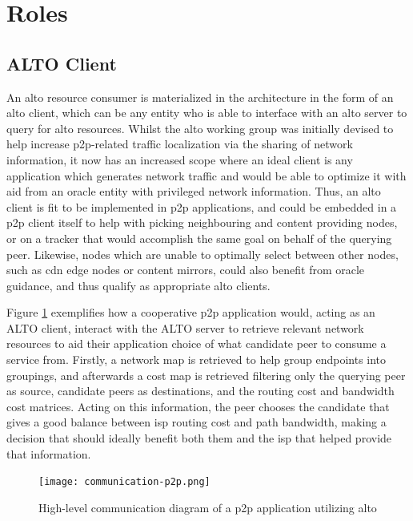 \section{Roles}

\subsection{ALTO Client}

    An \gls{alto} resource consumer is materialized in the architecture in the form of an \gls{alto} client, which can be any entity who is able to interface with an \gls{alto} server to query for \gls{alto} resources.
    Whilst the \gls{alto} working group was initially devised to help increase \gls{p2p}-related traffic localization via the sharing of network information, it now has an increased scope where an ideal client is any application which generates network traffic and would be able to optimize it with aid from an oracle entity with privileged network information.
    Thus, an \gls{alto} client is fit to be implemented in \gls{p2p} applications, and could be embedded in a \gls{p2p} client itself to help with picking neighbouring and content providing nodes, or on a tracker that would accomplish the same goal on behalf of the querying peer.
    Likewise, nodes which are unable to optimally select between other nodes, such as \gls{cdn} edge nodes or content mirrors, could also benefit from oracle guidance, and thus qualify as appropriate \gls{alto} clients.

    Figure \ref{fig:communication-p2p} exemplifies how a cooperative \gls{p2p} application would, acting as an ALTO client, interact with the ALTO server to retrieve relevant network resources to aid their application choice of what candidate peer to consume a service from.
    Firstly, a network map is retrieved to help group endpoints into groupings, and afterwards a cost map is retrieved filtering only the querying peer as source, candidate peers as destinations, and the routing cost and bandwidth cost matrices.
    Acting on this information, the peer chooses the candidate that gives a good balance between \gls{isp} routing cost and path bandwidth, making a decision that should ideally benefit both them and the \gls{isp} that helped provide that information.

\begin{figure}[H]
        \centering
        \hspace*{-0.7em}
        \texttt{[image: communication-p2p.png]}
        \caption{High-level communication diagram of a \gls{p2p} application utilizing \gls{alto}}
        \label{fig:communication-p2p}
\end{figure}

